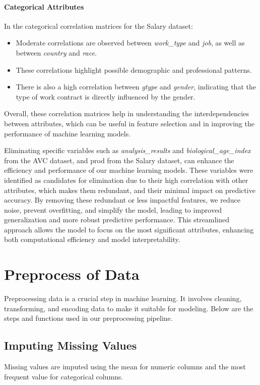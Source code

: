 \documentclass[a4paper,12pt]{article}
\begin{document}
\paragraph{Categorical Attributes}
In the categorical correlation matrices for the Salary dataset:
\begin{itemize}
    \item Moderate correlations are observed between \textit{work\_type} and \textit{job}, as well as between \textit{country} and \textit{race}.
    \item These correlations highlight possible demographic and professional patterns.
    \item There is also a high correlation between \textit{gtype} and \textit{gender}, indicating that the type of work contract is directly influenced by the gender.
\end{itemize}

Overall, these correlation matrices help in understanding the interdependencies between attributes, which can be useful in feature selection and in improving the performance of machine learning models.

Eliminating specific variables such as \textit{analysis\_results} and \textit{biological\_age\_index} from the AVC dataset, and prod from the Salary dataset, can enhance the efficiency and performance of our machine learning models. These variables were identified as candidates for elimination due to their high correlation with other attributes, which makes them redundant, and their minimal impact on predictive accuracy. By removing these redundant or less impactful features, we reduce noise, prevent overfitting, and simplify the model, leading to improved generalization and more robust predictive performance. This streamlined approach allows the model to focus on the most significant attributes, enhancing both computational efficiency and model interpretability.

\section{Preprocess of Data}

Preprocessing data is a crucial step in machine learning. It involves cleaning, transforming, and encoding data to make it suitable for modeling. Below are the steps and functions used in our preprocessing pipeline.

\subsection{Imputing Missing Values}
Missing values are imputed using the mean for numeric columns and the most frequent value for categorical columns.
\end{document}
